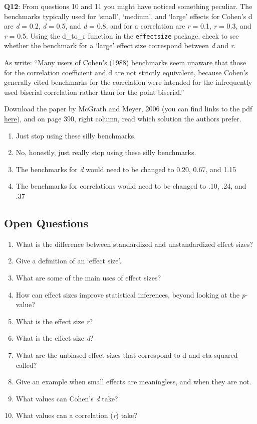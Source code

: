 \documentclass[
  oneside]{book}
\providecommand{\tightlist}{%
  \setlength{\itemsep}{0pt}\setlength{\parskip}{0pt}}
\begin{document}
\textbf{Q12}: From questions 10 and 11 you might have noticed something peculiar. The benchmarks typically used for `small', `medium', and `large' effects for Cohen's d are \emph{d} = 0.2, \emph{d} = 0.5, and \emph{d} = 0.8, and for a correlation are \emph{r} = 0.1, \emph{r} = 0.3, and \emph{r} = 0.5. Using the d\_to\_r function in the \texttt{effectsize} package, check to see whether the benchmark for a `large' effect size correspond between \emph{d} and \emph{r}.

As \citet{mcgrath_when_2006} write: ``Many users of Cohen's (1988) benchmarks seem unaware that those for the correlation coefficient and d are not strictly equivalent, because Cohen's generally cited benchmarks for the correlation were intended for the infrequently used biserial correlation rather than for the point biserial.''

Download the paper by McGrath and Meyer, 2006 (you can find links to the pdf \href{https://scholar.google.com/scholar?cluster=18022919125620514097\&as_sdt=0\%2C5\&inst=1903264034810781805}{here}), and on page 390, right column, read which solution the authors prefer.

\begin{enumerate}
\def\labelenumi{\Alph{enumi})}
\tightlist
\item
  Just stop using these silly benchmarks.
\item
  No, honestly, just really stop using these silly benchmarks.
\item
  The benchmarks for \emph{d} would need to be changed to 0.20, 0.67, and 1.15
\item
  The benchmarks for correlations would need to be changed to .10, .24, and .37
\end{enumerate}

\hypertarget{open-questions-4}{%
\subsection{Open Questions}\label{open-questions-4}}

\begin{enumerate}
\def\labelenumi{\arabic{enumi}.}
\item
  What is the difference between standardized and unstandardized effect sizes?
\item
  Give a definition of an `effect size'.
\item
  What are some of the main uses of effect sizes?
\item
  How can effect sizes improve statistical inferences, beyond looking at the \emph{p}-value?
\item
  What is the effect size \emph{r}?
\item
  What is the effect size \emph{d}?
\item
  What are the unbiased effect sizes that correspond to d and eta-squared called?
\item
  Give an example when small effects are meaningless, and when they are not.
\item
  What values can Cohen's \emph{d} take?
\item
  What values can a correlation (\emph{r}) take?
\end{enumerate}
\end{document}
